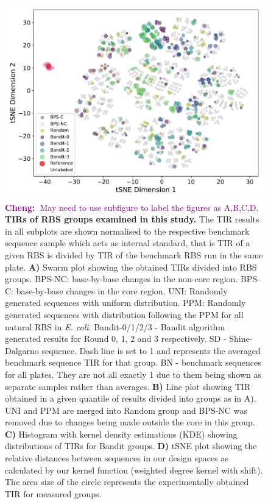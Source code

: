 \documentclass{article}
\newcommand{\cheng}[1]{\textcolor{purple}{{\bf Cheng:~}#1}}
\begin{document}
\begin{figure}[!ht]
    \includegraphics[scale=0.4]{plots/Main_Paper/tsneplot.pdf}
    \caption{\cheng{May need to use subfigure to label the figures as A,B,C,D.}
    \textbf{TIRs of RBS groups examined in this study.} 
    The TIR results in all subplots are shown normalised to the respective benchmark sequence sample which acts as internal standard, that is TIR of a given RBS is divided by TIR of the benchmark RBS run in the same plate. 
    \textbf{A)} Swarm plot showing the obtained TIRs divided into RBS groups.
    BPS-NC: base-by-base changes in the non-core region. 
    BPS-C: base-by-base changes in the core region. 
    UNI: Randomly generated sequences with uniform distribution. 
    PPM: Randomly generated sequences with distribution following the PPM for all natural RBS in \emph{E. coli}. 
    Bandit-0/1/2/3 - Bandit algorithm generated results for Round 0, 1, 2 and 3 respectively.
    SD - Shine-Dalgarno sequence.
    Dash line is set to 1 and represents the averaged benchmark sequence TIR for that group. 
    BN - benchmark sequences for all plates. 
    They are not all exactly 1 due to them being shown as separate samples rather than averages.
    \textbf{B)} Line plot showing TIR obtained in a given quantile of results divided into groups as in A).
    UNI and PPM are merged into Random group and BPS-NC was removed due to changes being made outside the core in this group. 
        \textbf{C)} Histogram with kernel density estimations (KDE) showing distributions of TIRs for Bandit groups.
    \textbf{D)} tSNE plot showing the relative distances between sequences in our design spaces as calculated by our kernel function (weighted degree kernel with shift). 
    The area size of the circle represents the experimentally obtained TIR for measured groups.}
    \label{fig: Swarmplot and Quantplot}
\end{figure}
\end{document}
